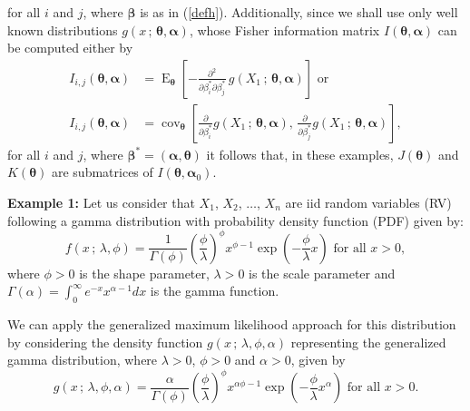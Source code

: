 \documentclass[10pt,a4paper,onecolumn]{article} %
\newcommand{\bs}{\boldsymbol}
\newcommand{\on}{\operatorname}
\begin{document}
 for all $i$ and $j$, where $\bs{\beta}$ is as in (\ref{defh}). Additionally, since we shall use only well known distributions $g(x\,;\, \bs{\theta},\bs{\alpha})$, whose  Fisher information matrix $I(\bs{\theta},\bs{\alpha})$ can be computed either by
 \begin{equation*}
 \begin{aligned}I_{i,j}(\bs{\theta},\bs{\alpha})&=
 \on{E}_{\bs{\theta}} \left[-\frac{\partial^2}{\partial \beta^*_i \partial\beta^*_j}\, g(X_1\, ;\, \bs{\theta},\bs{\alpha})\right]\mbox{ or}\\
 I_{i,j}(\bs{\theta},\bs{\alpha}) &=  \on{cov}_{\bs{\theta}} \left[\frac{\partial}{\partial \beta^*_i} g(X_1\, ;\, \bs{\theta}, \bs{\alpha}),\, \frac{\partial}{\partial \beta^*_j} g(X_1\, ;\, \bs{\theta},\bs{\alpha})\right],
 \end{aligned}
 \end{equation*}
for all $i$ and $j$, where $\bs{\beta}^*=(\bs{\alpha},\bs{\theta})$ it follows that, in these examples, $J(\bs{\theta})$ and $K(\bs{\theta})$ are submatrices of $I(\bs{\theta},\bs{\alpha}_0)$.

\noindent\textbf{Example 1:} Let us consider that $X_1$, $X_2$, $\ldots$, $X_n$   are iid random variables (RV) following a gamma distribution with probability density function (PDF) given by:
\begin{equation}\label{fdpgamma}
f(x\,;\,\lambda,\phi)=\frac{1}{\Gamma(\phi)}\left(\frac{\phi}{\lambda} \right)^{\phi} x^{\phi-1}\exp\left(-\frac{\phi}{\lambda} x \right)\mbox{ for all }x>0,
\end{equation}
where $\phi>0$ is the shape parameter,  $\lambda>0$ is the scale parameter and $\Gamma(\alpha)=\int_{0}^{\infty}{e^{-x}x^{\alpha-1}dx}$ is the  gamma function.

We can apply the generalized maximum likelihood approach for this distribution by considering the density function $g(x\,;\,\lambda,\phi,\alpha)$ representing the generalized gamma distribution,  where $\lambda>0$, $\phi>0$ and $\alpha>0$, given by
\begin{equation}\label{g}g(x\,;\,\lambda,\phi,\alpha)=\frac{\alpha}{\Gamma(\phi)}\left(\frac{\phi}{\lambda} \right)^\phi x^{\alpha\phi-1}\exp\left(-\frac{\phi}{\lambda} x^\alpha \right)\mbox{ for all }x>0.
\end{equation}
\end{document}
